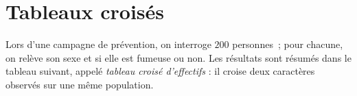 \documentclass[12pt]{article}
\title{
  \vspace{4em}
  \centering
  \tcbset{colframe=BlackSav,colback=GrayBG}
  \tcbox[tikznode]{
    Chapitre 2 \\Probabilités conditionnelles
  }
}
\author{}
\date{}
\theoremstyle{break}
\begin{document}
\maketitle

\tableofcontents

\newsavebox{\hidebox}

\newcommand{\hideM}[1]{\mbox{\vphantom{$#1$}\smash{\colorbox{gray!50}{\phantom{$\displaystyle #1$}}}} }
\newcommand{\hideMW}[1]{\mbox{\vphantom{$#1$}\smash{\colorbox{white}{\phantom{$\displaystyle #1$}}}} }
\newcommand{\hide}[1]{\mbox{\vphantom{#1}\smash{\colorbox{gray!50}{\phantom{#1}}}}}
\newcommand{\hidetk}[1]{}

\newcommand{\wvec}[1]{\overrightarrow{#1}}
\newcommand{\ssi}[0]{\emph{ssi}\ }
\newcommand{\setR}[0]{$\mathbb{R}$}


\renewcommand{\P}{\mathrm{P}}
\newcommand{\A}{\mathrm{A}}
\newcommand{\B}{\mathrm{B}}

\newpage
\section{Tableaux croisés}


Lors d'une campagne de prévention, on interroge $200$ personnes~; pour chacune, on relève son sexe et si elle est fumeuse ou non. Les résultats sont résumés dans le tableau suivant, appelé \emph{tableau croisé d'effectifs} : il croise deux caractères observés sur une même population.
 
\end{document}
